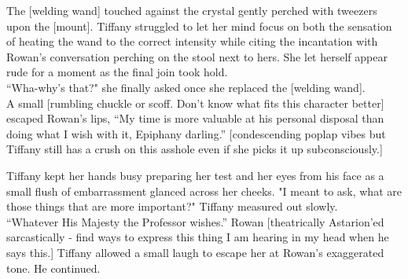 The [welding wand] touched against the crystal gently perched with tweezers upon the [mount].
Tiffany struggled to let her mind focus on both the sensation of heating the wand to the correct intensity while citing the incantation with Rowan's conversation perching on the stool next to hers.
She let herself appear rude for a moment as the final join took hold.\\

``Wha-why's that?" she finally asked once she replaced the [welding wand].\\

A small [rumbling chuckle or scoff. Don't know what fits this character better] escaped Rowan's lips, ``My time is more valuable at his personal disposal than doing what I wish with it, Epiphany darling.''
[condescending poplap vibes but Tiffany still has a crush on this asshole even if she picks it up subconsciously.]

Tiffany kept her hands busy preparing her test and her eyes from his face as a small flush of embarrassment glanced across her cheeks. 
"I meant to ask, what are those things that are more important?" Tiffany measured out slowly.\\

``Whatever His Majesty the Professor wishes.'' Rowan [theatrically Astarion'ed sarcastically - find ways to express this thing I am hearing in my head when he says this.]
Tiffany allowed a small laugh to escape her at Rowan's exaggerated tone. 
He continued.
